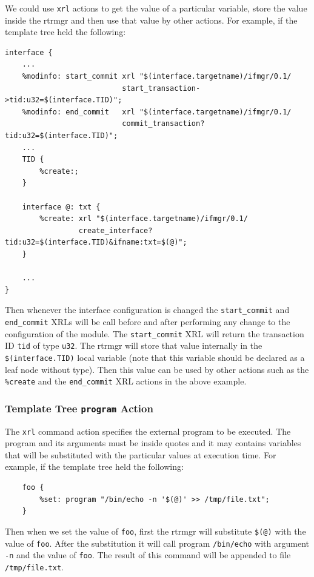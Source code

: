 \documentclass[11pt]{article}
\begin{document}
We could use {\tt xrl} actions to get the value of a particular variable,
store the value inside the rtrmgr and then use that value by other actions.
For example, if the template tree held the following:

\begin{verbatim}
interface {
    ...
    %modinfo: start_commit xrl "$(interface.targetname)/ifmgr/0.1/
                           start_transaction->tid:u32=$(interface.TID)";
    %modinfo: end_commit   xrl "$(interface.targetname)/ifmgr/0.1/
                           commit_transaction?tid:u32=$(interface.TID)";
    ...
    TID {
        %create:;
    }

    interface @: txt {
        %create: xrl "$(interface.targetname)/ifmgr/0.1/
                 create_interface?tid:u32=$(interface.TID)&ifname:txt=$(@)";
    }

    ...
}
\end{verbatim}

Then whenever the interface configuration is changed the {\tt start\_commit}
and {\tt end\_commit} XRLs will be call before and after performing any change
to the configuration of the module. The {\tt start\_commit} XRL will return
the transaction ID {\tt tid} of type {\tt u32}. The rtrmgr will store
that value internally in the {\tt \$(interface.TID)} local variable
(note that this variable should be declared as a leaf node without type).
Then this value can be used by other actions such as the
{\tt \%create} and the {\tt end\_commit} XRL actions in the above example.

\subsubsection{Template Tree {\tt program} Action}

The {\tt xrl} command action specifies the external program to be executed.
The program and its arguments must be inside quotes and it may contains
variables that will be substituted with the particular values at execution
time.
For example, if the template tree held the following:

\begin{verbatim}
    foo {
        %set: program "/bin/echo -n '$(@)' >> /tmp/file.txt";
    }
\end{verbatim}

Then when we set the value of {\tt foo}, first the rtrmgr will substitute
{\tt \$(@)} with the value of {\tt foo}. After the substitution it will
call program {\tt /bin/echo} with argument {\tt -n} and the value
of {\tt foo}. The result of this command will be appended to file
{\tt /tmp/file.txt}.
\end{document}
